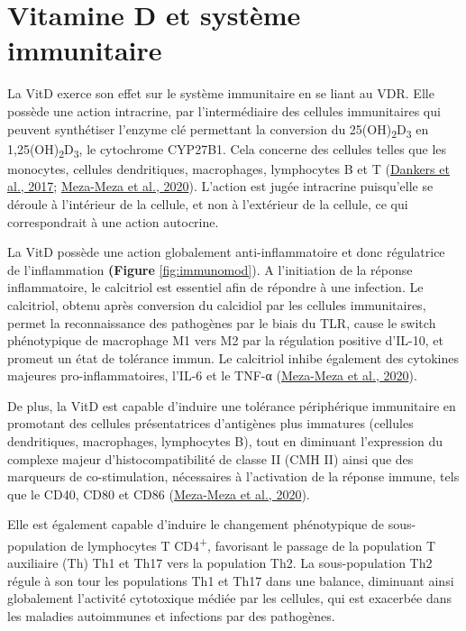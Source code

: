 \documentclass[
  letterpaper,
  DIV=11,
  numbers=noendperiod]{scrartcl}
\begin{document}
\hypertarget{vitamine-d-et-systuxe8me-immunitaire}{%
\section{Vitamine D et système
immunitaire}\label{vitamine-d-et-systuxe8me-immunitaire}}

La VitD exerce son effet sur le système immunitaire en se liant au VDR.
Elle possède une action intracrine, par l'intermédiaire des cellules
immunitaires qui peuvent synthétiser l'enzyme clé permettant la
conversion du 25(OH)\textsubscript{2}D\textsubscript{3} en
1,25(OH)\textsubscript{2}D\textsubscript{3}, le cytochrome CYP27B1. Cela
concerne des cellules telles que les monocytes, cellules dendritiques,
macrophages, lymphocytes B et T
(\protect\hyperlink{ref-Dankers.2017}{Dankers et al., 2017};
\protect\hyperlink{ref-Meza-Meza.2020}{Meza-Meza et al., 2020}).
L'action est jugée intracrine puisqu'elle se déroule à l'intérieur de la
cellule, et non à l'extérieur de la cellule, ce qui correspondrait à une
action autocrine.

La VitD possède une action globalement anti-inflammatoire et donc
régulatrice de l'inflammation \textbf{(Figure} \ref{fig:immunomod}). A
l'initiation de la réponse inflammatoire, le calcitriol est essentiel
afin de répondre à une infection. Le calcitriol, obtenu après conversion
du calcidiol par les cellules immunitaires, permet la reconnaissance des
pathogènes par le biais du TLR, cause le switch phénotypique de
macrophage M1 vers M2 par la régulation positive d'IL-10, et promeut un
état de tolérance immun. Le calcitriol inhibe également des cytokines
majeures pro-inflammatoires, l'IL-6 et le TNF-α
(\protect\hyperlink{ref-Meza-Meza.2020}{Meza-Meza et al., 2020}).

De plus, la VitD est capable d'induire une tolérance périphérique
immunitaire en promotant des cellules présentatrices d'antigènes plus
immatures (cellules dendritiques, macrophages, lymphocytes B), tout en
diminuant l'expression du complexe majeur d'histocompatibilité de classe
II (CMH II) ainsi que des marqueurs de co-stimulation, nécessaires à
l'activation de la réponse immune, tels que le CD40, CD80 et CD86
(\protect\hyperlink{ref-Meza-Meza.2020}{Meza-Meza et al., 2020}).

Elle est également capable d'induire le changement phénotypique de
sous-population de lymphocytes T CD4\textsuperscript{+}, favorisant le
passage de la population T auxiliaire (Th) Th1 et Th17 vers la
population Th2. La sous-population Th2 régule à son tour les populations
Th1 et Th17 dans une balance, diminuant ainsi globalement l'activité
cytotoxique médiée par les cellules, qui est exacerbée dans les maladies
autoimmunes et infections par des pathogènes.
\end{document}

